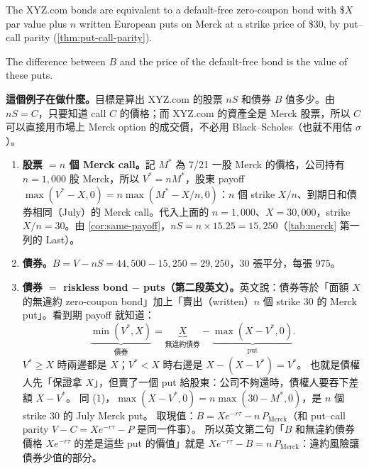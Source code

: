 \suppstart
{}
\suppend

The XYZ.com bonds are equivalent to a default-free zero-coupon bond with \$$X$ par value plus $n$ written European puts on Merck at a strike price of \$30, by put--call parity (\autoref{thm:put-call-parity}).

The difference between $B$ and the price of the default-free bond is the value of these puts.

\suppstart
{}

\begin{remark}
	\textbf{這個例子在做什麼。}目標是算出 XYZ.com 的股票 $nS$ 和債券 $B$ 值多少。由 $nS=C$，只要知道 call $C$ 的價格；而 XYZ.com 的資產全是 Merck 股票，所以 $C$ 可以直接用市場上 Merck option 的成交價，不必用 Black--Scholes（也就不用估 $\sigma$）。
	\begin{enumerate}[(1),nosep]
		\item \textbf{股票 $=n$ 個 Merck call。}記 $M^{*}$ 為 7/21 一股 Merck 的價格，公司持有 $n=1{,}000$ 股 Merck，所以 $V^{*}=nM^{*}$，股東 payoff $\max(V^{*}-X,0)=n\max(M^{*}-X/n,0)$：$n$ 個 strike $X/n$、到期日和債券相同（July）的 Merck call。代入上面的 $n=1{,}000$、$X=30{,}000$，strike $X/n=30$。由 \autoref{cor:same-payoff}，$nS=n\times15.25=15{,}250$（\autoref{tab:merck} 第一列的 Last）。
		\item \textbf{債券。}$B=V-nS=44{,}500-15{,}250=29{,}250$，30 張平分，每張 $975$。
		\item \textbf{債券 $=$ riskless bond $-$ puts（第二段英文）。}英文說：債券等於「面額 $X$ 的無違約 zero-coupon bond」加上「賣出（written）$n$ 個 strike $30$ 的 Merck put」。看到期 payoff 就知道：
		      \[
			      \underbrace{\min(V^{*},X)}_{\text{債券}}=\underbrace{X}_{\text{無違約債券}}-\underbrace{\max(X-V^{*},0)}_{\text{put}} .
		      \]
		      $V^{*}\ge X$ 時兩邊都是 $X$；$V^{*}<X$ 時右邊是 $X-(X-V^{*})=V^{*}$。
		      也就是債權人先「保證拿 $X$」，但賣了一個 put 給股東：公司不夠還時，債權人要吞下差額 $X-V^{*}$。
		      同 (1)，$\max(X-V^{*},0)=n\max(30-M^{*},0)$，是 $n$ 個 strike $30$ 的 July Merck put。
		      取現值：$B=Xe^{-r\tau}-n\,P_{\text{Merck}}$（和 put--call parity $V-C=Xe^{-r\tau}-P$ 是同一件事）。
		      所以英文第二句「$B$ 和無違約債券價格 $Xe^{-r\tau}$ 的差是這些 put 的價值」就是 $Xe^{-r\tau}-B=n\,P_{\text{Merck}}$：違約風險讓債券少值的部分。
	\end{enumerate}
\end{remark}
\suppend


